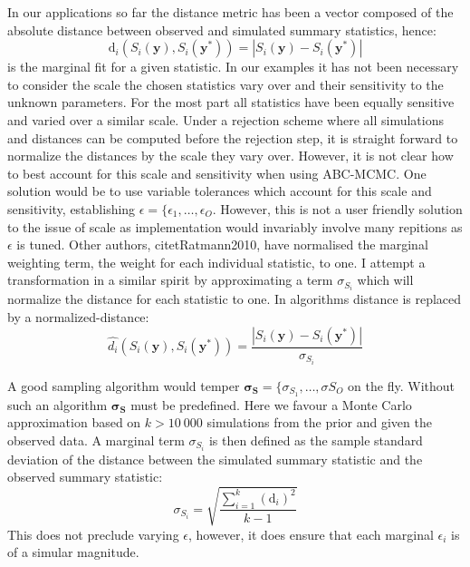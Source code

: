 In our applications so far the distance metric has been a vector composed of the absolute distance between observed and simulated summary statistics, hence:
\begin{equation}
\text{d}_i(S_i(\bm{y}),S_i(\bm{y^*})) = |S_i(\bm{y})-S_i(\bm{y^*})|
\end{equation}
is the marginal fit for a given statistic. In our examples it has not been necessary to consider the scale the chosen statistics vary over and their sensitivity to the unknown parameters. For the most part all statistics have been equally sensitive and varied over a similar scale. Under a rejection scheme where all simulations and distances can be computed before the rejection step, it is straight forward to normalize the distances by the scale they vary over. However, it is not clear how to best account for this scale and sensitivity when using ABC-MCMC. One solution would be to use variable tolerances which account for this scale and sensitivity, establishing $\epsilon = \{\epsilon_1,\dots,\epsilon_O$. However, this is not a user friendly solution to the issue of scale as implementation would invariably involve many repitions as $\epsilon$ is tuned. Other authors, citet{Ratmann2010}, have normalised the marginal weighting term, the weight for each individual statistic, to one. I attempt a transformation in a similar spirit by approximating a term $\sigma_{S_i}$ which will normalize the distance for each statistic to one. In algorithms distance is replaced by a normalized-distance:
\begin{equation}
\hat{d_i}(S_i(\bm{y}),S_i(\bm{y^*})) =  \frac{|S_i(\bm{y})-S_i(\bm{y^*})|}{\sigma_{S_i}}
\end{equation}

A good sampling algorithm would temper $\bm{\sigma_S} = \{\sigma_{S_1},\dots,\sigma{S_O}$ on the fly. Without such an algorithm $\bm{\sigma_S}$ must be predefined. Here we favour a Monte Carlo approximation based on $k > 10\ 000$ simulations from the prior and given the observed data. A marginal term $\sigma_{S_i}$ is then defined as the sample standard deviation of the distance between the simulated summary statistic and the observed summary statistic:
\begin{equation}
\sigma_{S_i} = \sqrt{\frac{\sum_{i = 1}^{k}(\text{d}_i)^2}{k-1}}
\end{equation}
This does not preclude varying $\epsilon$, however, it does ensure that each marginal $\epsilon_i$ is of a simular magnitude. \\




